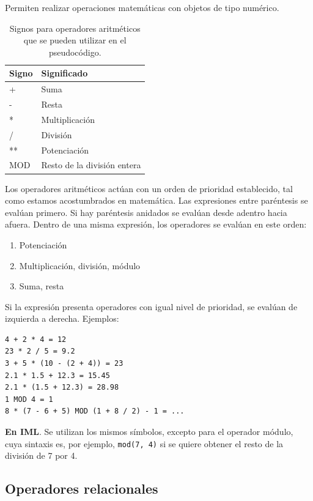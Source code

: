 \documentclass[]{book}
\providecommand{\tightlist}{%
  \setlength{\itemsep}{0pt}\setlength{\parskip}{0pt}}
\begin{document}
Permiten realizar operaciones matemáticas con objetos de tipo numérico.

\begin{table}

\caption{\label{tab:unnamed-chunk-12}Signos para operadores aritméticos que se pueden utilizar en el pseudocódigo.}
\centering
\begin{tabular}[t]{l|l}
\hline
Signo & Significado\\
\hline
+ & Suma\\
\hline
- & Resta\\
\hline
* & Multiplicación\\
\hline
/ & División\\
\hline
** & Potenciación\\
\hline
MOD & Resto de la división entera\\
\hline
\end{tabular}
\end{table}

Los operadores aritméticos actúan con un orden de prioridad establecido,
tal como estamos acostumbrados en matemática. Las expresiones entre
paréntesis se evalúan primero. Si hay paréntesis anidados se evalúan
desde adentro hacia afuera. Dentro de una misma expresión, los
operadores se evalúan en este orden:

\begin{enumerate}
\def\labelenumi{\arabic{enumi}.}
\tightlist
\item
  Potenciación
\item
  Multiplicación, división, módulo
\item
  Suma, resta
\end{enumerate}

Si la expresión presenta operadores con igual nivel de prioridad, se
evalúan de izquierda a derecha. Ejemplos:

\begin{verbatim}
4 + 2 * 4 = 12
23 * 2 / 5 = 9.2
3 + 5 * (10 - (2 + 4)) = 23
2.1 * 1.5 + 12.3 = 15.45
2.1 * (1.5 + 12.3) = 28.98
1 MOD 4 = 1
8 * (7 - 6 + 5) MOD (1 + 8 / 2) - 1 = ...
\end{verbatim}

\textbf{En IML}. Se utilizan los mismos símbolos, excepto para el
operador módulo, cuya sintaxis es, por ejemplo, \texttt{mod(7,\ 4)} si
se quiere obtener el resto de la división de 7 por 4.

\subsection{Operadores relacionales}\label{operadores-relacionales}
\end{document}
